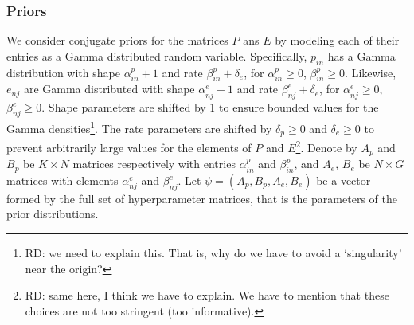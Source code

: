 \documentclass{bioinfo}
\begin{document}
\subsubsection{Priors} 
We consider conjugate priors for the matrices $P$ ans $E$ by modeling
each of their entries as a Gamma distributed random variable.
Specifically, $p_{in}$ has a Gamma distribution with shape
$\alpha_{in}^p + 1$ and rate $\beta_{in}^p + \delta_e$, for
$\alpha_{in}^p \geqslant 0$, $\beta_{in}^p \geqslant 0$. Likewise,
$e_{nj}$ are Gamma distributed with shape $\alpha_{nj}^e+1$ and rate
$\beta_{nj}^e + \delta_e$, for $\alpha_{nj}^e \geqslant 0$,
$\beta_{nj}^e \geqslant 0$. Shape parameters are shifted by 1 to
ensure bounded values for the Gamma densities\footnote{RD: we need to
explain this. That is, why do we have to avoid a `singularity' near
the origin?}. The rate parameters are shifted by $\delta_p \geqslant
0$ and $\delta_e \geqslant 0$ to prevent arbitrarily large values for
the elements of $P$ and $E$\footnote{RD: same here, I think we have to
explain. We have to mention that these choices are not too stringent
(too informative).}. Denote by $A_p$ and $B_p$ be $K\times N$ matrices
respectively with entries $\alpha_{in}^p$ and $\beta_{in}^p$, and
$A_e$, $B_e$ be $N\times G$ matrices with elements $\alpha_{nj}^e$ and
$\beta_{nj}^e$. Let $\psi = (A_p, B_p, A_e, B_e)$ be a vector formed
by the full set of hyperparameter matrices, that is the parameters of
the prior distributions.
\end{document}
